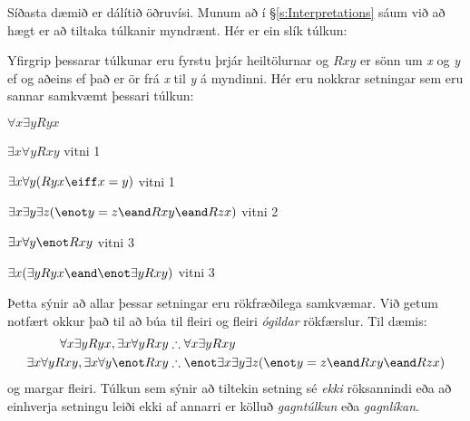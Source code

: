 Síðasta dæmið er dálítið öðruvísi. Munum að í \S\ref{s:Interpretations} sáum við að hægt er að tiltaka túlkanir myndrænt. Hér er ein slík túlkun:
\begin{center}
\end{center}
Yfirgrip þessarar túlkunar eru fyrstu þrjár heiltölurnar og $Rxy$ er sönn um \emph{x} og \emph{y} ef og aðeins ef það er ör frá \emph{x} til \emph{y} á myndinni. Hér eru nokkrar setningar sem eru sannar samkvæmt þessari túlkun:
\begin{ebullet}
	\item $\forall x \exists y Ryx$ 
	\item $\exists x \forall y Rxy$ \hfill vitni 1
	\item $\exists x \forall y (Ryx \eiff x = y)$ \hfill vitni 1
	\item $\exists x \exists y \exists z (\enot y = z \eand Rxy \eand Rzx)$ \hfill vitni 2
	\item $\exists x \forall y \enot Rxy$ \hfill vitni 3
	\item $\exists x (\exists y Ryx \eand \enot \exists y Rxy)$ \hfill vitni 3
\end{ebullet}
Þetta sýnir að allar þessar setningar eru rökfræðilega samkvæmar. Við getum notfært okkur það til að búa til fleiri og fleiri \emph{ógildar} rökfærslur. Til dæmis:
\begin{align*}
\forall x \exists y Ryx, \exists x \forall y Rxy  &\therefore  \forall x \exists y Rxy\\
\exists x \forall y Rxy, \exists x \forall y \enot Rxy & \therefore \enot \exists x \exists y \exists z (\enot y = z \eand Rxy \eand Rzx)
\end{align*}
og margar fleiri.
Túlkun sem sýnir að tiltekin setning sé \emph{ekki} röksannindi eða að einhverja setningu leiði ekki af annarri er kölluð \emph{gagntúlkun} eða \emph{gagnlíkan}.


